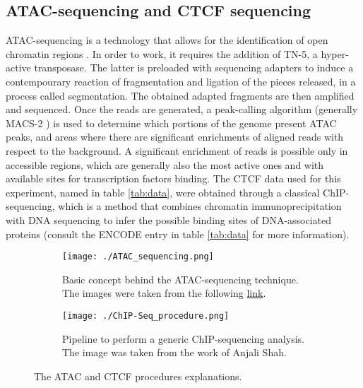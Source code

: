 \subsection{ATAC-sequencing and CTCF sequencing}
ATAC-sequencing is a technology that allows for the identification of open chromatin regions 
\cite{buenrostroTranspositionNativeChromatin2013a, grandiChromatinAccessibilityProfiling2022}. 
In order to work, it requires the addition of TN-5, a hyper-active transposase. The latter is preloaded with sequencing adapters
\cite{grandiChromatinAccessibilityProfiling2022}
to induce a contempourary reaction of fragmentation and ligation of the pieces released, in a process called segmentation. The obtained adapted fragments are then amplified and sequenced. Once the reads are generated, a peak-calling algorithm (generally MACS-2 
\cite{zhangModelbasedAnalysisChIPSeq2008a}) 
is used to determine which portions of the genome present ATAC peaks, and areas where there are significant enrichments of aligned reads with respect to the background. A significant enrichment of reads is possible only in accessible regions, which are generally also the most active ones and with available sites for transcription factors binding. The CTCF data used for this experiment, named in table \ref{tab:data}, were obtained through a classical ChIP-sequencing, which is a method that combines chromatin immunoprecipitation with DNA sequencing to infer the possible binding sites of DNA-associated proteins (consult the ENCODE entry in table \ref{tab:data} for more information).


\begin{figure}[H]
    \centering
    
    \begin{subfigure}{0.69\textwidth}
      \texttt{[image: ./ATAC\_sequencing.png]}
      \caption{Basic concept behind the ATAC-sequencing technique. The images were taken from the following \href{https://www.activemotif.com/catalog/1233/atac-seq-service}{link}.}
      \label{fig: ATAC-sequencing}
    \end{subfigure}
    \hfill
    \begin{subfigure}{0.30\textwidth}
      \texttt{[image: ./ChIP-Seq\_procedure.png]}
      \caption{Pipeline to perform a generic ChIP-sequencing analysis. The image was taken from the work of Anjali Shah\cite{shahChromatinImmunoprecipitationSequencing2009}.}
      \label{fig: CTCF ChIP-Seq}
    \end{subfigure}
  
    \caption{The ATAC and CTCF procedures explanations.}
\end{figure}
